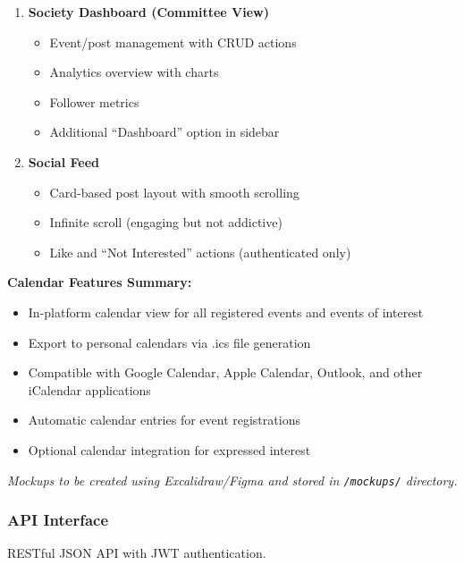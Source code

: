\documentclass[12pt,a4paper]{article}
\begin{document}
\begin{enumerate}
    \item \textbf{Society Dashboard (Committee View)}
    \begin{itemize}
        \item Event/post management with CRUD actions
        \item Analytics overview with charts
        \item Follower metrics
        \item Additional ``Dashboard'' option in sidebar
    \end{itemize}

    \item \textbf{Social Feed}
    \begin{itemize}
        \item Card-based post layout with smooth scrolling
        \item Infinite scroll (engaging but not addictive)
        \item Like and ``Not Interested'' actions (authenticated only)
    \end{itemize}
\end{enumerate}

\textbf{Calendar Features Summary:}
\begin{itemize}
    \item In-platform calendar view for all registered events and events of interest
    \item Export to personal calendars via .ics file generation
    \item Compatible with Google Calendar, Apple Calendar, Outlook, and other iCalendar applications
    \item Automatic calendar entries for event registrations
    \item Optional calendar integration for expressed interest
\end{itemize}

\textit{Mockups to be created using Excalidraw/Figma and stored in \texttt{/mockups/} directory.}

\subsubsection{API Interface}

RESTful JSON API with JWT authentication.
\end{document}

